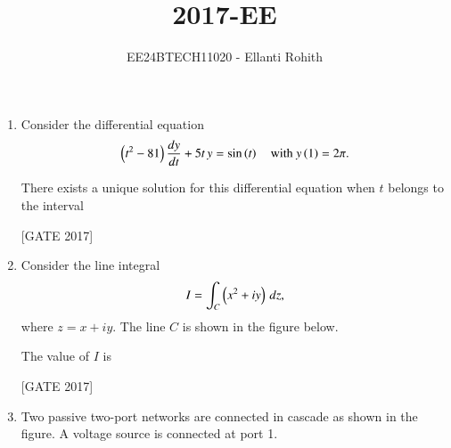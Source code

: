 \documentclass[journal,12pt,onecolumn]{IEEEtran}
\theoremstyle{remark}
\begin{document}

\vspace{3cm}

\title{2017-EE}
\author{EE24BTECH11020 -  Ellanti Rohith}
\maketitle

\renewcommand{\thefigure}{\theenumi}
\renewcommand{\thetable}{\theenumi}

\begin{enumerate}
\item Consider the differential equation 
\begin{align*}
\left(t^2 - 81\right) \frac{dy}{dt} + 5t \, y = \sin\left(t\right) \quad \text{with } y\left(1\right) = 2\pi.
\end{align*}

There exists a unique solution for this differential equation when $ t$  belongs to the interval

\hfill{[GATE 2017]} \begin{enumerate}
\end{enumerate}
\item Consider the line integral 
\begin{align*}
I = \int_C \left(x^2 + iy\right) \, dz,
\end{align*}
where $ z = x + iy $. The line $ C $ is shown in the figure below.

\begin{center}
    
\end{center}

The value of $ I $ is

\hfill{[GATE 2017]} \begin{enumerate}
\end{enumerate}
\item Two passive two-port networks are connected in cascade as shown in the figure. A voltage source is connected at port 1.


\end{enumerate}
\end{document}
